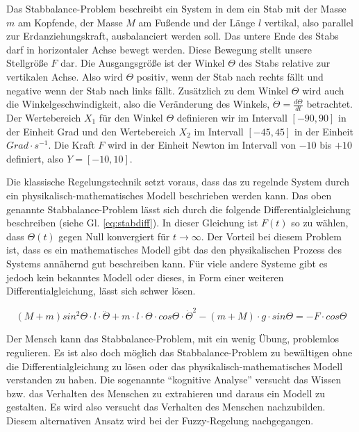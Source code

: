 \documentclass[12pt,a4paper,bibliography=totocnumbered,listof=totocnumbered, abstracton]{scrartcl}
\theoremstyle{Umgebung}
\begin{document}
\begin{bsp} 
	\label{bsp:stab}
	Das Stabbalance-Problem beschreibt ein System in dem ein Stab mit der Masse $m$ am Kopfende, der Masse $M$ am Fußende und der Länge $l$ vertikal, also parallel zur Erdanziehungskraft, ausbalanciert werden soll. Das untere Ende des Stabs darf in horizontaler Achse bewegt werden. Diese Bewegung stellt unsere Stellgröße $F$ dar. Die Ausgangsgröße ist der Winkel $\Theta$ des Stabs relative zur vertikalen Achse. Also wird $\Theta$ positiv, wenn der Stab nach rechts fällt und negative wenn der Stab nach links fällt. Zusätzlich zu dem Winkel $\Theta$ wird auch die Winkelgeschwindigkeit, also die Veränderung des Winkels, $\dot{\Theta} = \frac{d\Theta}{dt}$ betrachtet. Der Wertebereich $X_1$ für den Winkel $\Theta$ definieren wir im Intervall $\left[-90,90\right]$ in der Einheit Grad und den Wertebereich $X_2$ im Intervall $\left[-45, 45\right]$ in der Einheit $Grad \cdot s^{-1}$. Die Kraft $F$ wird in der Einheit Newton im Intervall von $-10$ bis $+10$ definiert, also $Y=\left[-10, 10\right]$.
\end{bsp}

Die klassische Regelungstechnik setzt voraus, dass das zu regelnde System durch ein physikalisch-mathematisches Modell beschrieben werden kann. Das oben genannte Stabbalance-Problem lässt sich durch die folgende Differentialgleichung beschreiben (siehe Gl. \ref{eq:stabdiff}). In dieser Gleichung ist $F(t)$ so zu wählen, dass $\Theta(t)$ gegen Null konvergiert für $t \rightarrow \infty$. Der Vorteil bei diesem Problem ist, dass es ein mathematisches Modell gibt das den physikalischen Prozess des Systems annähernd gut beschreiben kann. Für viele andere Systeme gibt es jedoch kein bekanntes Modell oder dieses, in Form einer weiteren Differentialgleichung, lässt sich schwer lösen.

\label{eq:stabdiff}
\begin{equation}
(M+m)sin^2 \Theta \cdot l \cdot \ddot{\Theta} + m \cdot l \cdot \Theta \cdot cos\Theta \cdot \dot{\Theta}^2 - (m + M) \cdot g \cdot sin \Theta = -F \cdot cos \Theta
\end{equation}

Der Mensch kann das Stabbalance-Problem, mit ein wenig Übung, problemlos regulieren. Es ist also doch möglich das Stabbalance-Problem zu bewältigen ohne die Differentialgleichung zu lösen oder das physikalisch-mathematisches Modell verstanden zu haben. Die sogenannte \enquote{kognitive Analyse} versucht das Wissen bzw. das Verhalten des Menschen zu extrahieren und daraus ein Modell zu gestalten. Es wird also versucht das Verhalten des Menschen nachzubilden. Diesem alternativen Ansatz wird bei der Fuzzy-Regelung nachgegangen.
\end{document}

